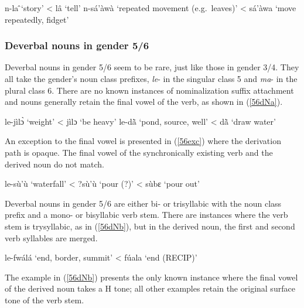 \begin{exe}
\ex\label{34dNb} 
\begin{xlist}
\ex n-la ̂`story' < lâ `tell'
\ex n-sá'àwà `repeated movement (e.g.\ leaves)' < sá'àwa `move repeatedly, fidget'
\end{xlist}
\end{exe}

\subsubsection{Deverbal nouns in gender 5/6}
\label{sec:NOM56}

Deverbal nouns in gender 5/6 seem to be rare, just like those in gender 3/4. They all take the gender's noun class prefixes, {\itshape le}- in the singular class 5 and {\itshape ma}- in the plural class 6. There are no known instances of nominalization suffix attachment and nouns generally retain the final vowel of the verb, as shown in (\ref{56dNa}). 

\begin{exe}
\ex\label{56dNa} 
\begin{xlist}
\ex le-jìlɔ̀ `weight' <  jìlɔ `be heavy'
\ex le-dã̀ `pond, source, well'  <  dã̀ `draw water'
\end{xlist}
\end{exe}

\noindent An exception to the final vowel is presented in (\ref{56exc}) where the derivation path is opaque. The final vowel of the synchronically existing verb and the derived noun do not match.

\begin{exe}
\ex\label{56exc} le-sù'ù `waterfall' < ?sù'ù `pour (?)'  < sùbɛ `pour out'
\end{exe}

Deverbal nouns in gender 5/6 are either bi- or trisyllabic with the noun class prefix and a mono- or bisyllabic verb stem. There are instances where the verb stem is trysyllabic, as in (\ref{56dNb}), but in the derived noun, the first and second verb syllables are merged.

\begin{exe}
\ex\label{56dNb} le-fwálá `end, border, summit' <  fúala `end (RECIP)'
\end{exe}

\noindent The example in (\ref{56dNb}) presents the only known instance where the final vowel of the derived noun takes a H tone; all other examples retain the original surface tone of the verb stem.


